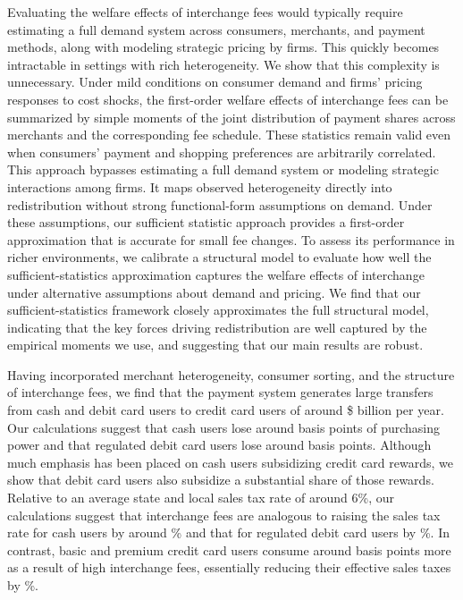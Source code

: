 \documentclass[main.tex]{subfiles}
\begin{document}
Evaluating the welfare effects of interchange fees would typically require estimating a full demand system across consumers, merchants, and payment methods, along with modeling strategic pricing by firms. 
This quickly becomes intractable in settings with rich heterogeneity. 
We show that this complexity is unnecessary. 
Under mild conditions on consumer demand and firms' pricing responses to cost shocks, the first-order welfare effects of interchange fees can be summarized by simple moments of the joint distribution of payment shares across merchants and the corresponding fee schedule. 
These statistics remain valid even when consumers' payment and shopping preferences are arbitrarily correlated. 
This approach bypasses estimating a full demand system or modeling strategic interactions among firms. It maps observed heterogeneity directly into redistribution without strong functional-form assumptions on demand.
Under these assumptions, our sufficient statistic approach provides a first-order approximation that is accurate for small fee changes. 
To assess its performance in richer environments, we calibrate a structural model to evaluate how well the sufficient-statistics approximation captures the welfare effects of interchange under alternative assumptions about demand and pricing.
We find that our sufficient-statistics framework closely approximates the full structural model, indicating that the key forces driving redistribution are well captured by the empirical moments we use, and suggesting that our main results are robust.

Having incorporated merchant heterogeneity, consumer sorting, and the structure of interchange fees, we find that the payment system generates large transfers from cash and debit card users to credit card users of around \$ billion per year.
Our calculations suggest that cash users lose around  basis points of purchasing power and that regulated debit card users lose around  basis points.
Although much emphasis has been placed on cash users subsidizing credit card rewards, we show that debit card users also subsidize a substantial share of those rewards.
Relative to an average state and local sales tax rate of around 6\%, our calculations suggest that interchange fees are analogous to raising the sales tax rate for cash users by around \% and that for regulated debit card users by \%.
In contrast, basic and premium credit card users consume around  basis points more as a result of high interchange fees, essentially reducing their effective sales taxes by \%.
\end{document}
